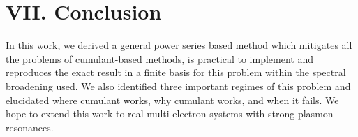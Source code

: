 \documentclass[%
 reprint,
 amsmath,amssymb,
 aps,prl,
floatfix
]{revtex4-2}
\begin{document}
\section{VII. Conclusion}
In this work, we derived a general power series based method which mitigates all the problems of cumulant-based methods, is practical to implement and reproduces the exact result in a finite basis for this problem within the spectral broadening used. We also identified three important regimes of this problem and elucidated where cumulant works, why cumulant works, and when it fails. We hope to extend this work to real multi-electron systems with strong plasmon resonances. 
 
\end{document}
